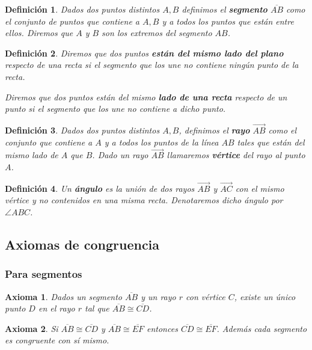 \documentclass[12pt, spanish]{article}
\newtheorem*{defin}{Definición}
\def\theaxsection{}
\newcommand{\setaxsection}[1]{\def\theaxsection{#1}\setcounter{ax}{0}}
\theoremstyle{axstyle}
\newtheorem{ax}{Axioma}
\theoremstyle{axbstyle}
\begin{document}
\begin{defin}
  Dados dos puntos distintos $A, B$ definimos el \textbf{segmento}
  $\overline{AB}$ como el conjunto de puntos que contiene a $A, B$ y a todos los
  puntos que están entre ellos. Diremos que $A$ y $B$ son los extremos del
  segmento $AB$.
\end{defin}

\begin{defin}
  Diremos que dos puntos \textbf{están del mismo lado del plano} respecto de una
  recta si el segmento que los une no contiene ningún punto de la recta.

  Diremos que dos puntos están del mismo \textbf{lado de una recta} respecto de
  un punto si el segmento que los une no contiene a dicho punto.
\end{defin}

\begin{defin}
  Dados dos puntos distintos $A, B$, definimos el \textbf{rayo}
  $\overrightarrow{AB}$ como el conjunto que contiene a $A$ y a todos los puntos
  de la línea $AB$ tales que están del mismo lado de $A$ que $B$. Dado un rayo
  $\overrightarrow{AB}$ llamaremos \textbf{vértice} del rayo al punto $A$.
\end{defin}

\begin{defin}
  Un \textbf{ángulo} es la unión de dos rayos $\overrightarrow{AB}$ y
  $\overrightarrow{AC}$ con el mismo vértice y no contenidos en una misma recta.
  Denotaremos dicho ángulo por $\angle ABC$.
\end{defin}

\subsection{Axiomas de congruencia}
\subsubsection{Para segmentos}
\setaxsection{C}

\begin{ax}\label{C1}
  Dados un segmento $\overline{AB}$ y un rayo $r$ con vértice $C$, existe un
  único punto $D$ en el rayo $r$ tal que $\overline{AB}\cong\overline{CD}$.
\end{ax}

\begin{ax}\label{C2}
  Si $\overline{AB}\cong\overline{CD}$ y $\overline{AB}\cong\overline{EF}$
  entonces $\overline{CD}\cong\overline{EF}$. Además cada segmento es congruente
  con sí mismo.
\end{ax}
\end{document}
